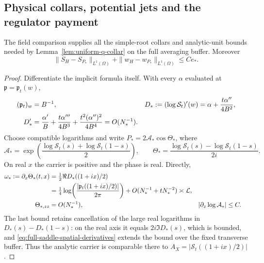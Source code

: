 \subsection{Physical collars, potential jets and the regulator payment}
\begin{lemma}\label{lem:full-saddle-collars}
The field comparison supplies all the simple-root collars and
analytic-unit bounds needed by Lemma~\ref{lem:uniform-q-collar} on
the full averaging buffer. Moreover
\begin{equation}
 \|S_H-S_{P_*}\|_{L^1(\Omega)}
       +\|w_H-w_{P_*}\|_{L^1(\Omega)}\le Ce_*.
 \label{eq:full-saddle-L1}
\end{equation}
\end{lemma}
\begin{proof}
Differentiate the implicit formula itself. With every $\alpha$ evaluated
at $\mathfrak p=\mathfrak p_t(w)$,
\begin{align}
 (\mathfrak p_t)_w&=B^{-1},&
 D_*:=(\log\mathcal S_t)'(w)&=\alpha+\frac{t\alpha''}{4B^2},\notag\\
 D_*'&=\frac{\alpha'}B+\frac{t\alpha'''}{4B^3}
            +\frac{t^2(\alpha'')^2}{4B^4}=O(N_*^{-1}).
 \label{eq:full-saddle-spatial-derivatives}
\end{align}
Choose compatible logarithms and write
$P_*=2\mathcal A_*\cos\Theta_*$, where
\[
 \mathcal A_*=
  \exp\!\left(\frac{\log\mathcal S_t(s)+\log\mathcal S_t(1-s)}2\right),
 \qquad
 \Theta_*=
  \frac{\log\mathcal S_t(s)-\log\mathcal S_t(1-s)}{2i}.
\]
On real $x$ the carrier is positive and the phase is real. Directly,
\begin{align}
 \omega_*:=\partial_x\Theta_*(t,x)
 &=\tfrac12\Re D_*((1+ix)/2)\notag\\
 &=\tfrac14\log\!\left(\frac{|\mathfrak p_t((1+ix)/2)|}{2\pi}\right)
            +O(N_*^{-1}+tN_*^{-2})\asymp\mathcal L,\notag\\
 \Theta_{*,zz}&=O(N_*^{-1}),&
 |\partial_z\log\mathcal A_*|&\le C.
 \label{eq:full-saddle-phase-bounds}
\end{align}
The last bound retains cancellation of the large real logarithms in
$D_*(s)-D_*(1-s)$: on the real axis it equals $2i\Im D_*(s)$, which
is bounded, and \eqref{eq:full-saddle-spatial-derivatives} extends the
bound over the fixed transverse buffer. Thus the analytic carrier is
comparable there to $A_X=|\mathcal S_t((1+ix)/2)|$.


\end{proof}
